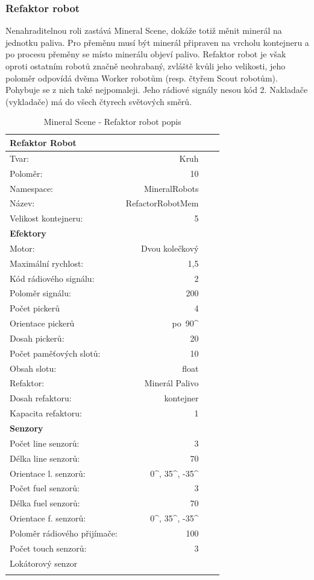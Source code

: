 \subsubsection{Refaktor robot}
Nenahraditelnou roli zastává Mineral Scene, dokáže totiž měnit minerál na jednotku paliva. Pro přeměnu musí být minerál připraven na vrcholu kontejneru a po procesu přeměny se místo minerálu objeví palivo. Refaktor robot je však oproti ostatním robotů značně neohrabaný, zvláště kvůli jeho velikosti, jeho poloměr odpovídá dvěma Worker robotům (resp. čtyřem Scout robotům). Pohybuje se z nich také nejpomaleji. Jeho rádiové signály nesou kód 2. Nakladače (vykladače) má do všech čtyrech světových směrů. 
\par  
\begin{table}[h]\centering
	\begin{tabular}{l@{\hspace{1.0cm}}D{.}{,}{2.2}D{.}{,}{2.2}D{.}{,}{2.3}}
		\toprule
		\textbf{Refaktor Robot} \\
		\midrule
		Tvar: & Kruh\\
		Poloměr: & 10 \\
		Namespace: & MineralRobots\\
		Název: & RefactorRobotMem \\
		Velikost kontejneru: & 5\\
		\midrule
		\textbf{Efektory} \\
		\midrule
		Motor: & Dvou kolečkový \\
		Maximální rychlost: & 1,5 \\
		Kód rádiového signálu: & 2\\
		Poloměr signálu: & 200\\
		Počet pickerů & 4\\
		Orientace pickerů & po\ 90^\circ\\ 
		Dosah pickerů: & 20\\
		Počet paměťových slotů: &10 \\
		Obsah slotu: & float\\
		Refaktor: & Minerál \Rightarrow Palivo \\
		Dosah refaktoru:  & kontejner \\
		Kapacita refaktoru: & 1\\ 
		\midrule 
		\textbf{Senzory} \\
		\midrule
		Počet line senzorů: &  3\\
		Délka line senzorů: & 70\\
		Orientace l. senzorů: & 0^\circ, 35^\circ, -35^\circ\\
		Počet fuel senzorů: &  3\\
		Délka fuel senzorů: & 70\\
		Orientace f. senzorů: & 0^\circ, 35^\circ, -35^\circ\\
		Poloměr rádiového přijímače: & 100 \\
		Počet touch senzorů: & 3 \\  
		Lokátorový senzor\\ 
		\bottomrule
	\end{tabular}
	\caption{Mineral Scene - Refaktor robot popis }
	\label{tab04:MineralRefactor}
\end{table}
\clearpage
